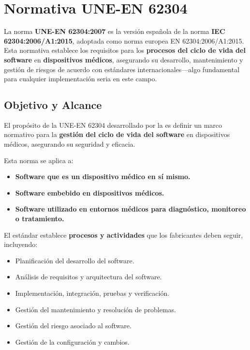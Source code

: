 \chapter{Normativa UNE-EN 62304}\label{ch:regulatory_framework}

La norma \textbf{UNE-EN 62304:2007} \cite{UNE-EN-62304} es la versión española de la norma \textbf{IEC 62304:2006/A1:2015}, adoptada como norma europea EN 62304:2006/A1:2015. Esta normativa establece los requisitos para los \textbf{procesos del ciclo de vida del software} en \textbf{dispositivos médicos}, asegurando su desarrollo, mantenimiento y gestión de riesgos de acuerdo con estándares internacionales—algo fundamental para cualquier implementación seria en este campo.

\section{Objetivo y Alcance}
El propósito de la UNE-EN 62304 desarrollado por la \cite{UNE-EN-62304} es definir un marco normativo para la \textbf{gestión del ciclo de vida del software} en dispositivos médicos, asegurando su seguridad y eficacia. 

Esta norma se aplica a:
\begin{itemize}
    \item \textbf{Software que es un dispositivo médico en sí mismo.}
    \item \textbf{Software embebido en dispositivos médicos.}
    \item \textbf{Software utilizado en entornos médicos para diagnóstico, monitoreo o tratamiento.}
\end{itemize}

El estándar establece \textbf{procesos y actividades} que los fabricantes deben seguir, incluyendo:
\begin{itemize}
    \item Planificación del desarrollo del software.
    \item Análisis de requisitos y arquitectura del software.
    \item Implementación, integración, pruebas y verificación.
    \item Gestión del mantenimiento y resolución de problemas.
    \item Gestión del riesgo asociado al software.
    \item Gestión de la configuración y cambios.
\end{itemize}

\newpage

